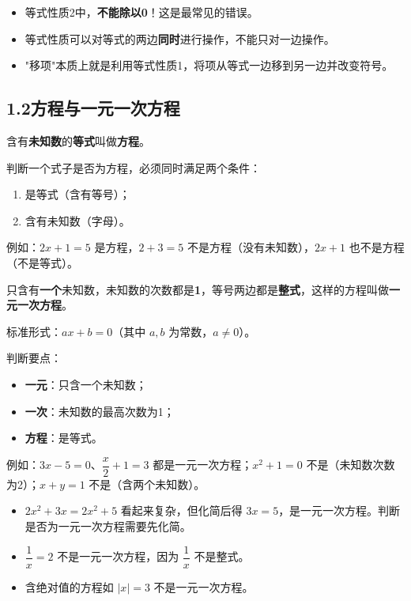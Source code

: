 \documentclass[12pt, a4paper]{ctexart}
\begin{document}
\begin{warnbox}[易错提醒]
\begin{itemize}[nosep]
  \item 等式性质2中，\textbf{不能除以0}！这是最常见的错误。
  \item 等式性质可以对等式的两边\textbf{同时}进行操作，不能只对一边操作。
  \item "移项"本质上就是利用等式性质1，将项从等式一边移到另一边并改变符号。
\end{itemize}
\end{warnbox}

\subsection*{1.2\quad 方程与一元一次方程}

\begin{knowledgebox}[方程的概念]
含有\textbf{未知数}的\textbf{等式}叫做\textbf{方程}。

判断一个式子是否为方程，必须同时满足两个条件：
\begin{enumerate}[nosep]
  \item 是等式（含有等号）；
  \item 含有未知数（字母）。
\end{enumerate}

例如：$2x+1=5$ 是方程，$2+3=5$ 不是方程（没有未知数），$2x+1$ 也不是方程（不是等式）。
\end{knowledgebox}

\begin{knowledgebox}[一元一次方程的概念]
只含有\textbf{一个}未知数，未知数的次数都是\textbf{1}，等号两边都是\textbf{整式}，这样的方程叫做\textbf{一元一次方程}。

标准形式：$ax+b=0$（其中 $a,b$ 为常数，$a\neq 0$）。

判断要点：
\begin{itemize}[nosep]
  \item \textbf{一元}：只含一个未知数；
  \item \textbf{一次}：未知数的最高次数为1；
  \item \textbf{方程}：是等式。
\end{itemize}

例如：$3x-5=0$、$\dfrac{x}{2}+1=3$ 都是一元一次方程；$x^2+1=0$ 不是（未知数次数为2）；$x+y=1$ 不是（含两个未知数）。
\end{knowledgebox}

\begin{warnbox}[易错提醒]
\begin{itemize}[nosep]
  \item $2x^2+3x=2x^2+5$ 看起来复杂，但化简后得 $3x=5$，是一元一次方程。判断是否为一元一次方程需要先化简。
  \item $\dfrac{1}{x}=2$ 不是一元一次方程，因为 $\dfrac{1}{x}$ 不是整式。
  \item 含绝对值的方程如 $|x|=3$ 不是一元一次方程。
\end{itemize}
\end{warnbox}
\end{document}
